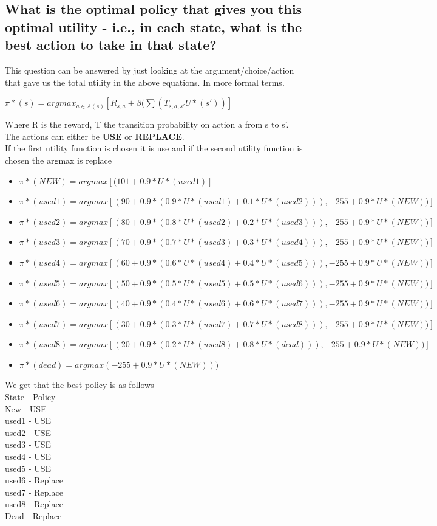 \documentclass[11pt]{scrartcl} %
\begin{document}
\subsection{What is the optimal policy that gives you this optimal utility - i.e., in each state, what is the best action to
take in that state?}
This question can be answered by just looking at the argument/choice/action that gave us the total utility in the above equations. In more formal terms.
\begin{center}
$\pi*(s) = argmax_{a\in A(s)}[R_{s, a}+\beta (\sum(T_{s, a, s'}U*(s'))]$
\end{center}
Where R is the reward, T the transition probability on action a from s to s'.\\
The actions can either be \textbf{USE} or \textbf{REPLACE}.\\ If the first utility function is chosen it is use and if the second utility function is chosen the argmax is replace
\begin{itemize}
\item $\pi*(NEW) = argmax[(101+0.9*U*(used1)]$ 
\item $\pi*(used1) = argmax[(90+0.9*(0.9*U*(used1)+0.1*U*(used2))), -255+0.9*U*(NEW))]$ 
\item $\pi*(used2) = argmax[(80+0.9*(0.8*U*(used2)+0.2*U*(used3))), -255+0.9*U*(NEW))]$ 
\item $\pi*(used3) = argmax[(70+0.9*(0.7*U*(used3)+0.3*U*(used4))), -255+0.9*U*(NEW))]$ 
\item $\pi*(used4) = argmax[(60+0.9*(0.6*U*(used4)+0.4*U*(used5))), -255+0.9*U*(NEW))]$ 
\item $\pi*(used5) = argmax[(50+0.9*(0.5*U*(used5)+0.5*U*(used6))), -255+0.9*U*(NEW))]$ 
\item $\pi*(used6) = argmax[(40+0.9*(0.4*U*(used6)+0.6*U*(used7))), -255+0.9*U*(NEW))]$ 
\item $\pi*(used7) = argmax[(30+0.9*(0.3*U*(used7)+0.7*U*(used8))), -255+0.9*U*(NEW))]$ 
\item $\pi*(used8) = argmax[(20+0.9*(0.2*U*(used8)+0.8*U*(dead))), -255+0.9*U*(NEW))]$ 
\item $\pi*(dead) = argmax(-255 + 0.9*U*(NEW)))$

\end{itemize}
We get that the best policy is as follows\\
State - Policy\\
New - USE\\
used1 - USE\\
used2 - USE\\
used3 - USE\\
used4 - USE\\
used5 - USE\\
used6 - Replace\\
used7 - Replace\\
used8 - Replace\\
Dead  - Replace
\end{document}
